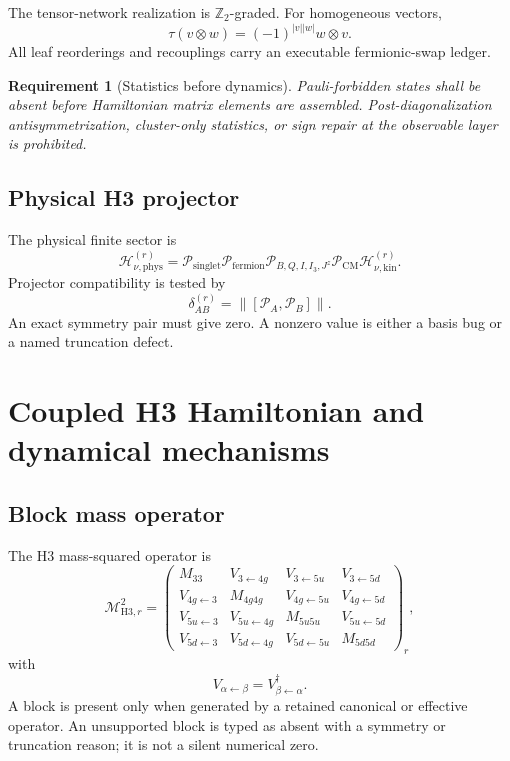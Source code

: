 \documentclass[11pt]{article}
\newtheorem{requirement}[definition]{Requirement}
\newcommand{\Hil}{\mathcal H}
\newcommand{\cM}{\mathcal M}
\newcommand{\cP}{\mathcal P}
\newcommand{\norm}[1]{\left\lVert#1\right\rVert}
\newcommand{\phys}{\mathrm{phys}}
\newcommand{\COM}{\mathrm{CM}}
\newcommand{\Jz}{J^z}
\begin{document}
The tensor-network realization is \(\mathbb Z_2\)-graded.  For homogeneous
vectors,
\begin{equation}
 \tau(v\otimes w)
 =(-1)^{|v||w|}w\otimes v.
 \label{eq:fermionic-braiding}
\end{equation}
All leaf reorderings and recouplings carry an executable fermionic-swap
ledger.

\begin{requirement}[Statistics before dynamics]
Pauli-forbidden states shall be absent before Hamiltonian matrix elements are
assembled.  Post-diagonalization antisymmetrization, cluster-only statistics,
or sign repair at the observable layer is prohibited.
\end{requirement}

\subsection{Physical H3 projector}

The physical finite sector is
\begin{equation}
 \Hil_{\nu,\phys}^{(r)}
 =
 \cP_{\mathrm{singlet}}
 \cP_{\mathrm{fermion}}
 \cP_{B,Q,I,I_3,\Jz}
 \cP_{\COM}
 \Hil_{\nu,\mathrm{kin}}^{(r)}.
\end{equation}
Projector compatibility is tested by
\begin{equation}
 \delta_{AB}^{(r)}
 =\norm{[\cP_A,\cP_B]}.
\end{equation}
An exact symmetry pair must give zero.  A nonzero value is either a basis bug
or a named truncation defect.

\section{Coupled H3 Hamiltonian and dynamical mechanisms}
\label{sec:hamiltonian}

\subsection{Block mass operator}

The H3 mass-squared operator is
\begin{equation}
 \cM_{\mathrm{H3},r}^{2}
 =
 \begin{pmatrix}
  M_{33} & V_{3\leftarrow4g} & V_{3\leftarrow5u} & V_{3\leftarrow5d}\\
  V_{4g\leftarrow3} & M_{4g4g} & V_{4g\leftarrow5u} & V_{4g\leftarrow5d}\\
  V_{5u\leftarrow3} & V_{5u\leftarrow4g} & M_{5u5u} & V_{5u\leftarrow5d}\\
  V_{5d\leftarrow3} & V_{5d\leftarrow4g} & V_{5d\leftarrow5u} & M_{5d5d}
 \end{pmatrix}_{r},
 \label{eq:h3-hamiltonian}
\end{equation}
with
\begin{equation}
 V_{\alpha\leftarrow\beta}
 =V_{\beta\leftarrow\alpha}^{\dagger}.
\end{equation}
A block is present only when generated by a retained canonical or effective
operator.  An unsupported block is typed as absent with a symmetry or
truncation reason; it is not a silent numerical zero.
\end{document}
